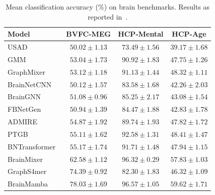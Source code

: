 \documentclass[acmsmall]{acmart}
\begin{document}
\begin{table}[h]
\centering
\caption{
Mean classification accuracy (\%) on brain benchmarks.
Results as reported in~\cite{behrouz2024brain}.
}
\label{tab:Healthcompare}
\scriptsize

\begin{tabular}{lccc}
\toprule
\textbf{Model} &
\textbf{BVFC-MEG} &
\textbf{HCP-Mental} &
\textbf{HCP-Age} \\
\midrule
USAD~\cite{audibert2020usad}
& $50.02\pm1.13$ & $73.49\pm1.56$ & $39.17\pm1.68$ \\
GMM~\cite{he2023generalization}
& $53.04\pm1.73$ & $90.92\pm1.83$ & $47.75\pm1.26$ \\
GraphMixer~\cite{cong2023we}
& $53.12\pm1.18$ & $91.13\pm1.44$ & $48.32\pm1.11$ \\
BrainNetCNN~\cite{kawahara2017brainnetcnn}
& $50.12\pm1.57$ & $83.58\pm1.68$ & $42.26\pm2.03$ \\
BrainGNN~\cite{li2021braingnn}
& $51.08\pm0.96$ & $85.25\pm2.17$ & $43.08\pm1.54$ \\
FBNetGen~\cite{kan2022fbnetgen}
& $50.94\pm1.39$ & $84.47\pm1.88$ & $42.83\pm1.78$ \\
ADMIRE~\cite{behrouz2023admire++}
& $54.87\pm1.92$ & $89.74\pm1.93$ & $47.82\pm1.72$ \\
PTGB~\cite{yang2023ptgb}
& $55.11\pm1.62$ & $92.58\pm1.31$ & $48.41\pm1.47$ \\
BNTransformer~\cite{kan2022brain}
& $55.17\pm1.74$ & $91.71\pm1.48$ & $47.94\pm1.15$ \\
BrainMixer~\cite{behrouz2023learning}
& $62.58\pm1.12$ & $96.32\pm0.29$ & $57.83\pm1.03$ \\
\rowcolor{lightgray}
GraphS4mer~\cite{tang2023modeling}
& $74.39\pm0.92$ & $82.30\pm1.83$ & $46.32\pm1.09$ \\
\rowcolor{lightgray}
BrainMamba~\cite{behrouz2024brain}
& $78.03\pm1.69$ & $96.57\pm1.05$ & $59.62\pm1.71$ \\
\bottomrule
\end{tabular}
\end{table}
\end{document}
